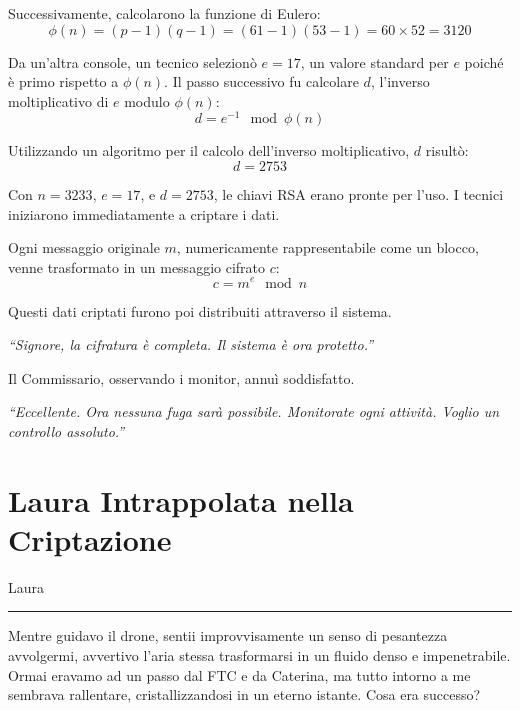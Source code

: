 Successivamente, calcolarono la funzione di Eulero:
\[
\phi(n) = (p-1)(q-1) = (61-1)(53-1) = 60 \times 52 = 3120\]

Da un’altra console, un tecnico selezionò \( e = 17 \), un valore standard per \( e \) poiché è primo rispetto a \( \phi(n) \). Il passo successivo fu calcolare \( d \), l’inverso moltiplicativo di \( e \) modulo \( \phi(n) \):
\[
 d = e^{-1} \mod \phi(n)
\]

Utilizzando un algoritmo per il calcolo dell’inverso moltiplicativo, \( d \) risultò:
\[
 d = 2753
\]

Con \( n = 3233 \), \( e = 17 \), e \( d = 2753 \), le chiavi RSA erano pronte per l’uso. I tecnici iniziarono immediatamente a criptare i dati.

Ogni messaggio originale \( m \), numericamente rappresentabile come un blocco, venne trasformato in un messaggio cifrato \( c \):
\[
 c = m^e \mod n
\]


Questi dati criptati furono poi distribuiti attraverso il sistema.

\begin{tcolorbox}[colback=white!95!green!5, colframe=green!75!black, title=\textbf{Risultato della Cifratura RSA}, fonttitle=\bfseries]
\emph{\enquote{Signore, la cifratura è completa. Il sistema è ora protetto.}}
\end{tcolorbox}

Il Commissario, osservando i monitor, annuì soddisfatto.
\newpage

\begin{tcolorbox}[colback=white!95!blue!5, colframe=blue!75!black, title=\textbf{Commissario}, fonttitle=\bfseries]
\emph{\enquote{Eccellente. Ora nessuna fuga sarà possibile. Monitorate ogni attività. Voglio un controllo assoluto.}}
\end{tcolorbox}



\section{Laura Intrappolata nella Criptazione}

\vspace{1em}
\begin{center}Laura\end{center}
\hrule
\vspace{1em}

Mentre guidavo il drone, sentii improvvisamente un senso di pesantezza avvolgermi, avvertivo  l'aria stessa  trasformarsi in un fluido denso e impenetrabile.
Ormai eravamo ad un passo dal FTC e da Caterina, ma tutto intorno a me sembrava rallentare, cristallizzandosi in un eterno istante. Cosa era successo?


